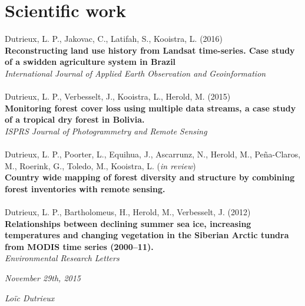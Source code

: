 \documentclass[]{friggeri-cv}
\begin{document}
\section{Scientific work}
    Dutrieux, L. P., Jakovac, C., Latifah, S., Kooistra, L. (2016)\\
    \textbf{Reconstructing land use history from Landsat time-series. Case study of a swidden agriculture system in Brazil}\\
    \textit{International Journal of Applied Earth Observation and Geoinformation}\\
    \\
    Dutrieux, L. P., Verbesselt, J., Kooistra, L., Herold, M. (2015)\\
    \textbf{Monitoring forest cover loss using multiple data streams, a case study of a tropical dry forest in Bolivia.}\\
    \textit{ISPRS Journal of Photogrammetry and Remote Sensing}\\
    \\
    Dutrieux, L. P., Poorter, L., Equihua, J., Ascarrunz, N., Herold, M., Pe\~{n}a-Claros, M., Roerink, G., Toledo, M., Kooistra, L. (\textit{in review})\\
    \textbf{Country wide mapping of forest diversity and structure by combining forest inventories with remote sensing.}\\
    \\
    Dutrieux, L. P., Bartholomeus, H., Herold, M., Verbesselt, J. (2012)\\
    \textbf{Relationships between declining summer sea ice, increasing temperatures and changing vegetation in the Siberian Arctic tundra from MODIS time series (2000–11).}\\
    \textit{Environmental Research Letters}\\


\begin{flushleft}
\emph{November 29th, 2015}
\end{flushleft}
\begin{flushright}
\emph{Lo\"{i}c Dutrieux}
\end{flushright}
\end{document}
